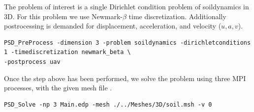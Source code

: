 \newcommand{\psd}[1]{{\small\sffamily{\color{blue!60}#1}}}



The problem of interest is a single Dirichlet condition problem of
soildynamics in 3D. For this problem we use Newmark-\(\beta\) time
discretization. Additionally postrocessing is demanded for displacement,
acceleration, and velocity (\(u,a,v\)).

\begin{lstlisting}[style=BashInputStyle]
PSD_PreProcess -dimension 3 -problem soildynamics -dirichletconditions 1 -timediscretization newmark_beta \
-postprocess uav
\end{lstlisting}

Once the step above has been performed, we solve the problem using three
MPI processes, with the given mesh file \psd{soil.msh}.

\begin{lstlisting}[style=BashInputStyle]
PSD_Solve -np 3 Main.edp -mesh ./../Meshes/3D/soil.msh -v 0
\end{lstlisting}

